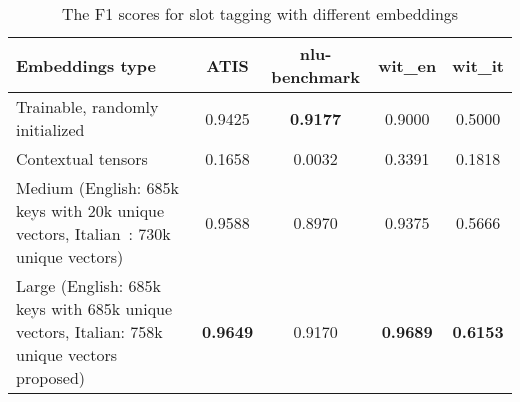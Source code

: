 
\begin{table}
  \begin{tabularx}{\textwidth}{Lcccc}
    \toprule
    \textbf{Embeddings type} & \textbf{ATIS} & \textbf{nlu-benchmark} & \textbf{wit\_en} & \textbf{wit\_it} \\
    \midrule
    Trainable, randomly initialized & 0.9425 & \textbf{0.9177} & 0.9000 & 0.5000 \\
    \midrule
    Contextual tensors & 0.1658 & 0.0032 & 0.3391 & 0.1818 \\
    \midrule
    Medium (English: 685k keys with 20k unique vectors, Italian~\cite{berardi2015word}: 730k unique vectors) & 0.9588 & 0.8970 & 0.9375 & 0.5666 \\
    \midrule
    Large (English: 685k keys with 685k unique vectors, Italian: 758k unique vectors proposed) & \textbf{0.9649} & 0.9170 & \textbf{0.9689} & \textbf{0.6153} \\
    \bottomrule
  \end{tabularx}
  \caption{The F1 scores for slot tagging with different embeddings}\label{tab:slotsEmbeddingsChoice}
\end{table}